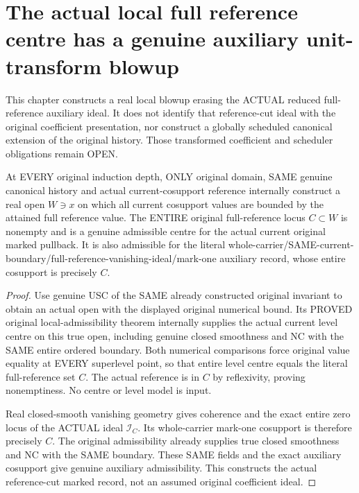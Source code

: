 \section{The actual local full reference centre has a genuine auxiliary unit-transform blowup}

This chapter constructs a real local blowup erasing the ACTUAL reduced
full-reference auxiliary ideal. It does not identify that reference-cut
ideal with the original coefficient presentation, nor construct a globally
scheduled canonical extension of the original history. Those transformed
coefficient and scheduler obligations remain OPEN.

\begin{theorem}
\label{hir:original-local-full-reference-original-only-admissible-centre}
\leanok
{}
At EVERY original induction depth, ONLY original domain, SAME genuine
canonical history and actual current-cosupport reference internally construct
a real open $W\ni x$ on which all current cosupport values are bounded by
the attained full reference value. The ENTIRE original full-reference locus
$C\subset W$ is nonempty and is a genuine admissible centre for the actual
current original marked pullback. It is also admissible for the literal
whole-carrier/SAME-current-boundary/full-reference-vanishing-ideal/mark-one
auxiliary record, whose entire cosupport is precisely $C$.
\end{theorem}
\begin{proof}
Use genuine USC of the SAME already constructed original invariant to obtain
an actual open with the displayed original numerical bound. Its PROVED
original local-admissibility theorem internally supplies the actual current
level centre on this true open, including genuine closed smoothness and NC
with the SAME entire ordered boundary. Both numerical comparisons force
original value equality at EVERY superlevel point, so that entire level
centre equals the literal full-reference set $C$. The actual reference is
in $C$ by reflexivity, proving nonemptiness. No centre or level model is input.

Real closed-smooth vanishing geometry gives coherence and the exact entire
zero locus of the ACTUAL ideal $\mathcal I_C$. Its whole-carrier mark-one
cosupport is therefore precisely $C$. The original admissibility already
supplies true closed smoothness and NC with the SAME boundary. These SAME
fields and the exact auxiliary cosupport give genuine auxiliary
admissibility. This constructs the actual reference-cut marked record, not
an assumed original coefficient ideal.
\end{proof}

